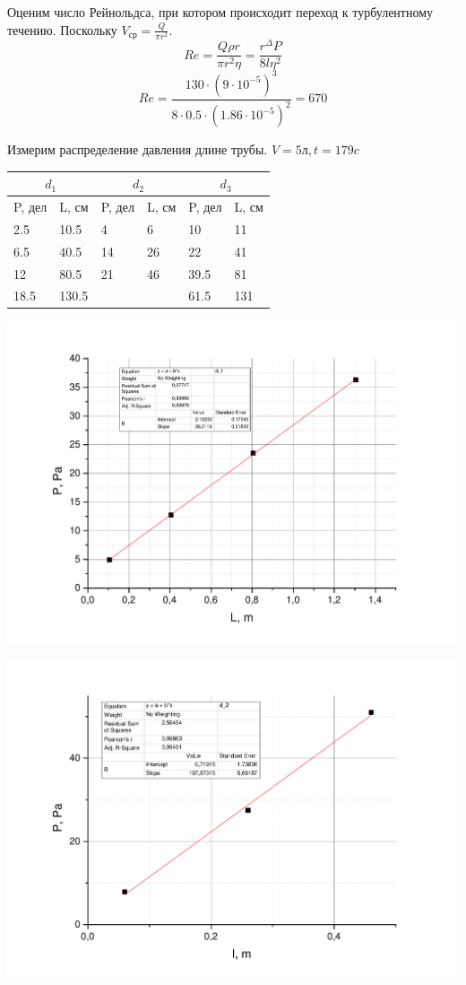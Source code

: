 \documentclass[a4paper,12pt]{article}
\begin{document}
		Оценим число Рейнольдса, при котором происходит переход к турбулентному течению. Поскольку $V_{\text{ср}}=\frac{Q}{\pi r^2}$.
		\[
		Re= \frac{Q\rho r}{\pi r^2 \eta} = \frac{r^\Delta P}{8 l \eta^2}
		\]
		\[
		Re = \frac{130 \cdot (9\cdot 10^{-5})^3}{8\cdot 0.5 \cdot (1.86\cdot10^{-5})^2} = 670
		\]
		
		
	Измерим распределение давления длине трубы.
	$V = 5\text{л}, t = 179 c$
	\begin{center}
		\begin{tabular}{ l | l | l | l | l | l }
			\multicolumn{2}{c}{$d_1$} & \multicolumn{2}{c}{$d_2$} & \multicolumn{2}{c}{$d_3$} \\ \hline
			P, дел & L, см & P, дел & L, см & P, дел & L, см \\ \hline
			2.5 & 10.5 & 4 & 6 & 10 & 11 \\ \hline
			6.5 & 40.5 & 14 & 26 & 22 & 41 \\ \hline
			12 & 80.5 & 21 & 46 & 39.5 & 81 \\ \hline
			18.5 & 130.5 &  &  & 61.5 & 131  \\ \hline
		\end{tabular}
	\end{center}
	
	\includegraphics[width = 0.9\linewidth]{Graph2}
	
	\includegraphics[width = 0.9\linewidth]{Graph3}
	
\end{document}
